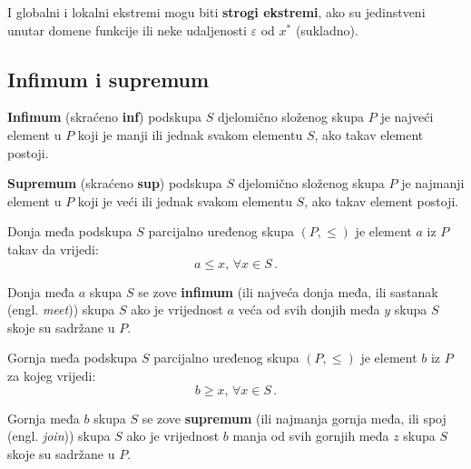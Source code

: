 I globalni i lokalni ekstremi mogu biti \textbf{strogi ekstremi}, ako su
jedinstveni unutar domene funkcije ili neke udaljenosti $\varepsilon$ od $x^*$ (sukladno).

\subsection{Infimum i supremum}

\textbf{Infimum} (skraćeno \textbf{inf}) podskupa $S$ djelomično složenog
skupa $P$ je najveći element u $P$ koji je manji ili jednak svakom elementu
$S$, ako takav element postoji.

\smallskip
\noindent
\textbf{Supremum} (skraćeno \textbf{sup}) podskupa $S$ djelomično složenog
skupa $P$ je najmanji element u $P$ koji je veći ili jednak svakom elementu
$S$, ako takav element postoji.

\begin{definition}[infimum]
    Donja međa podskupa $S$ parcijalno uređenog skupa $(P, \leq)$ je element $a$
    iz $P$ takav da vrijedi:
    $$
        a \leq x,\, \forall x \in S\,.
    $$

    Donja međa $a$ skupa $S$ se zove \textbf{infimum} (ili najveća donja međa,
    ili sastanak (engl. \textit{meet})) skupa $S$ ako je vrijednost $a$ veća od
    svih donjih međa $y$ skupa $S$ skoje su sadržane u $P$.
\end{definition}


\begin{definition}[supremum]
    Gornja međa podskupa $S$ parcijalno uređenog skupa $(P, \leq)$ je element
    $b$ iz $P$ za kojeg vrijedi:
    $$
        b \geq x,\, \forall x \in S\,.
    $$

    Gornja međa $b$ skupa $S$ se zove \textbf{supremum} (ili najmanja gornja
    međa, ili spoj (engl. \textit{join})) skupa $S$ ako je vrijednost $b$ manja
    od svih gornjih međa $z$ skupa $S$ skoje su sadržane u $P$.
\end{definition}

